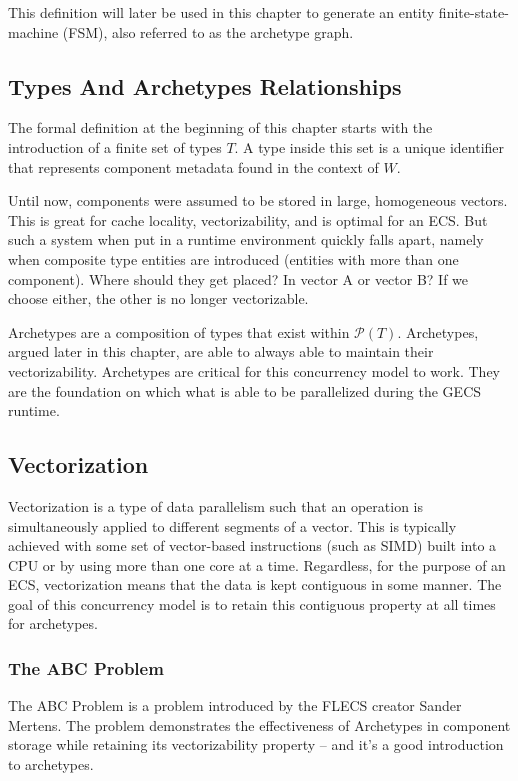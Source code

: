 This definition will later be used in this chapter to generate an entity finite-state-machine (FSM), also referred to as the archetype graph.

\subsection{Types And Archetypes Relationships}
The formal definition at the beginning of this chapter starts with the introduction of a finite set of types $T$. A type inside this set is a unique identifier that represents component metadata found in the context of $W$.

Until now, components were assumed to be stored in large, homogeneous vectors. This is great for cache locality, vectorizability, and is optimal for an ECS. But such a system when put in a runtime environment quickly falls apart, namely when composite type entities are introduced (entities with more than one component). Where should they get placed? In vector A or vector B? If we choose either, the other is no longer vectorizable. 

Archetypes are a composition of types that exist within $\mathcal{P}(T)$. Archetypes, argued later in this chapter, are able to always able to maintain their vectorizability. Archetypes are critical for this concurrency model to work. They are the foundation on which what is able to be parallelized during the GECS runtime. \cite{SanderMertensECS}

\subsection{Vectorization}
Vectorization is a type of data parallelism such that an operation is simultaneously applied to different segments of a vector. This is typically achieved with some set of vector-based instructions (such as SIMD) built into a CPU or by using more than one core at a time. Regardless, for the purpose of an ECS, vectorization means that the data is kept contiguous in some manner. The goal of this concurrency model is to retain this contiguous property at all times for archetypes. \cite{vectorization_wolfe_michael}

\subsubsection{The ABC Problem}


The ABC Problem is a problem introduced by the FLECS creator Sander Mertens.\cite{SanderMertensECS} The problem demonstrates the effectiveness of Archetypes in component storage while retaining its vectorizability property -- and it's a good introduction to archetypes.


